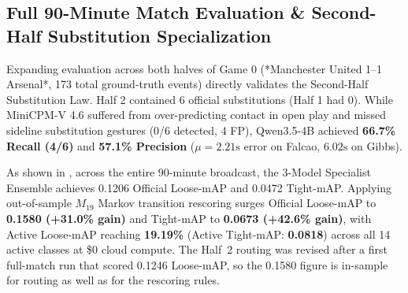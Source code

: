 \documentclass[10pt,twocolumn,letterpaper]{article}
\begin{document}
\subsection{Full 90-Minute Match Evaluation \& Second-Half Substitution Specialization}
Expanding evaluation across both halves of Game 0 (*Manchester United 1--1 Arsenal*, 173 total ground-truth events) directly validates the Second-Half Substitution Law. Half 2 contained 6 official substitutions (Half 1 had 0). While MiniCPM-V 4.6 suffered from over-predicting contact in open play and missed sideline substitution gestures (0/6 detected, 4 FP), Qwen3.5-4B achieved \textbf{66.7\% Recall (4/6)} and \textbf{57.1\% Precision} ($\mu = 2.21\text{s}$ error on Falcao, $6.02\text{s}$ on Gibbs). 

As shown in , across the entire 90-minute broadcast, the 3-Model Specialist Ensemble achieves 0.1206 Official Loose-mAP and 0.0472 Tight-mAP. Applying out-of-sample $M_{19}$ Markov transition rescoring surges Official Loose-mAP to \textbf{0.1580 (+31.0\% gain)} and Tight-mAP to \textbf{0.0673 (+42.6\% gain)}, with Active Loose-mAP reaching \textbf{19.19\%} (Active Tight-mAP: \textbf{0.0818}) across all 14 active classes at \$0 cloud compute. The Half~2 routing was revised after a first full-match run that scored 0.1246 Loose-mAP, so the 0.1580 figure is in-sample for routing as well as for the rescoring rules.

\begin{table}[h]
\centering
\small
\caption{\textbf{Full 90-Minute Match Action Spotting DevKit Metrics (Game 0, 173 Ground-Truth Events).}}
\label{tab:full_match_eval}
\end{table}
\end{document}
